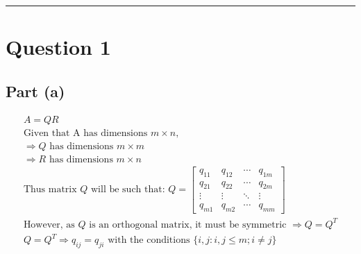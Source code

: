 \documentclass[letterpaper,10pt]{article}
\begin{document}
	 \newline
	 \newline
	 \newline
	\newline \hrule

	\section{Question 1}
		\subsection{Part (a)}
			\begin{gather*}
				A = Q R \\
				\text{Given that A has dimensions $m \times n$,} \\
				\Rightarrow \text{$Q$ has dimensions $m \times m$} \\
				\Rightarrow \text{$R$ has dimensions $m \times n$} \\
				\text{Thus matrix $Q$ will be such that: } Q = \begin{bmatrix}
					q_{11} & q_{12} & \cdots & q_{1m} \\
					q_{21} & q_{22} & \cdots & q_{2m} \\
					\vdots & \vdots & \ddots & \vdots \\
					q_{m1} & q_{m2} & \cdots & q_{mm}
				\end{bmatrix} \\
				\text{However, as $Q$ is an orthogonal matrix, it must be symmetric } \Rightarrow Q = Q^T \\
				Q = Q^T \Rightarrow q_{ij} = q_{ji} \text{ with the conditions } \{ i,j : i,j \leq m ; i \neq j \}
			\end{gather*}
\end{document}
